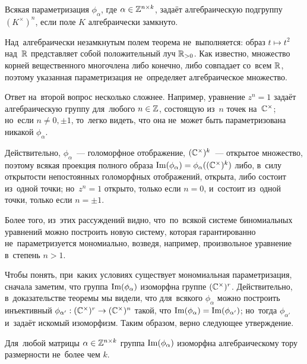 \begin{theorem}
\label{theorem:AlgebraicityCondition}
  Всякая параметризация $\phi_\alpha$, где $\alpha \in \mathbb{Z}^{n \times k}$, задаёт алгебраическую подгруппу $(K^\times)^n$,
  если поле $K$ алгебраически замкнуто.
\end{theorem}

\begin{example*}
  Над~алгебраически незамкнутым полем теорема не~выполняется: образ $t \mapsto t^2$ над~$\mathbb{R}$
  представляет собой положительный луч $\mathbb{R}_{>0}$. Как известно, множество корней вещественного многочлена либо конечно,
  либо совпадает со~всем $\mathbb{R}$, поэтому указанная параметризация не~определяет алгебраическое множество.
\end{example*}

Ответ на~второй вопрос несколько сложнее. Например, уравнение $z^n = 1$ задаёт алгебраическую
группу для~любого $n \in \mathbb{Z}$, состоящую из~$n$ точек на~$\mathbb{C}^\times$; но~если $n \neq 0, \pm 1$,
то~легко видеть, что она не~может быть параметризована никакой $\phi_\alpha$.

Действительно, $\phi_\alpha$~— голоморфное отображение, $(\mathbb{C}^\times)^k$~— открытое множество,
поэтому всякая проекция полного образа $\mathrm{Im}(\phi_\alpha) = \phi_\alpha((\mathbb{C}^\times)^k)$ либо, в~силу
открытости непостоянных голоморфных отображений, открыта, либо состоит из~одной точки; но~$z^n = 1$
открыто, только если $n = 0$, и~состоит из~одной точки, только если $n = \pm 1$.

Более того, из~этих рассуждений видно, что~по~всякой системе биномиальных уравнений можно построить новую систему,
которая гарантированно не~параметризуется мономиально, возведя, например, произвольное уравнение в~степень $n > 1$.

Чтобы понять, при~каких условиях существует мономиальная параметризация, сначала заметим, что группа $\mathrm{Im}(\phi_\alpha)$
изоморфна группе $(\mathbb{C}^\times)^r$. Действительно, в~доказательстве теоремы мы видели, что для~всякого $\phi_\alpha$
можно построить инъективный $\phi_{\alpha'} : (\mathbb{C}^\times)^r \rightarrow (\mathbb{C}^\times)^n$ такой, что $\mathrm{Im}(\phi_\alpha) = \mathrm{Im}(\phi_{\alpha'})$;
но~тогда $\phi_{\alpha'}$ и~задаёт искомый изоморфизм. Таким образом, верно следующее утверждение.

\begin{statement*}
  Для~любой матрицы $\alpha \in \mathbb{Z}^{n \times k}$ группа $\mathrm{Im}(\phi_\alpha)$ изоморфна алгебраическому тору размерности не~более чем $k$.
\end{statement*}

